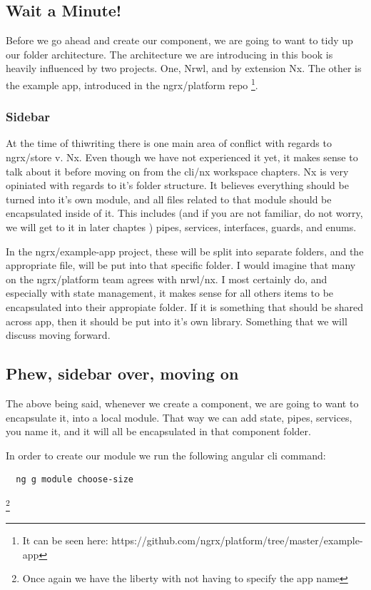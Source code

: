 \subsection {Wait a Minute!}
Before we go ahead and create our component, we are going to want to tidy up
our folder architecture. The architecture we are introducing in this book is
heavily influenced by two projects. One, Nrwl, and by extension Nx. The other is
the example app, introduced in the ngrx/platform repo \footnote{It can be seen
here: https://github.com/ngrx/platform/tree/master/example-app}.

\subsubsection {Sidebar}
At the time of thiwriting there is one main area of conflict with regards to
ngrx/store v. Nx. Even though we have not experienced it yet, it makes sense to
talk about it before moving on from the cli/nx workspace chapters. Nx is very
opiniated with regards to it's folder structure. It believes everything should
be turned into it's own module, and all files related to that module should
be encapsulated inside of it. This includes (and if you are not familiar, do not
worry, we will get to it in later chaptes ) pipes, services, interfaces, guards,
and enums.

In the ngrx/example-app project, these will be split into separate folders, and
the appropriate file, will be put into that specific folder. I would imagine
that many on the ngrx/platform team agrees with nrwl/nx. I most certainly do,
and especially with state management, it makes sense for all others items to
be encapsulated into their appropiate folder. If it is something that should be
shared across app, then it should be put into it's own library. Something that
we will discuss moving forward.

\subsection {Phew, sidebar over, moving on}

The above being said, whenever we create a component, we are going to want to
encapsulate it, into a local module. That way we can add state, pipes, services,
you name it, and it will all be encapsulated in that component folder.

In order to create our module we run the following angular cli command:

\begin{verbatim}
  ng g module choose-size
\end{verbatim}
\footnote{Once again we have the liberty with not having to
specify the app name}

